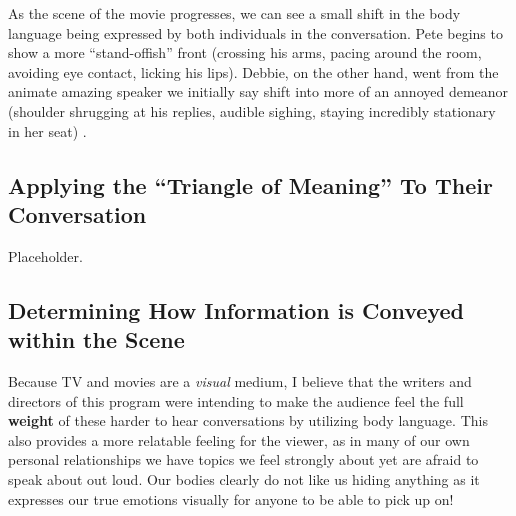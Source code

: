 \documentclass[stu,12pt]{apa7}
\begin{document}
      As the scene of the movie progresses, we can see a small shift in the
        body language being expressed by both individuals in the conversation.
        Pete begins to show a more ``stand-offish'' front (crossing his arms,
        pacing around the room, avoiding eye contact, licking his lips). Debbie,
        on the other hand, went from the animate amazing speaker we initially
        say shift into more of an annoyed demeanor (shoulder shrugging at his
        replies, audible sighing, staying incredibly stationary in her seat)
        \parencite{apatow_this_2012}.

    \subsection{Applying the ``Triangle of Meaning'' To Their Conversation}
      Placeholder.

    \subsection{Determining How Information is Conveyed within the Scene}
      Because TV and movies are a \textit{visual} medium, I believe that the
        writers and directors of this program were intending to make the
        audience feel the full \textbf{weight} of these harder to hear
        conversations by utilizing body language. This also provides a more
        relatable feeling for the viewer, as in many of our own personal
        relationships we have topics we feel strongly about yet are afraid to
        speak about out loud. Our bodies clearly do not like us hiding anything
        as it expresses our true emotions visually for anyone to be able to
        pick up on!


  \newpage
  \printbibliography[%
    title={References},%
    heading={bibintoc},%
    notcategory={consulted}%
  ]


  \newpage
  \nocite{*}
  \printbibliography[%
    title={Additional References},%
    heading={bibintoc},%
    category={consulted}%
  ]
\end{document}
